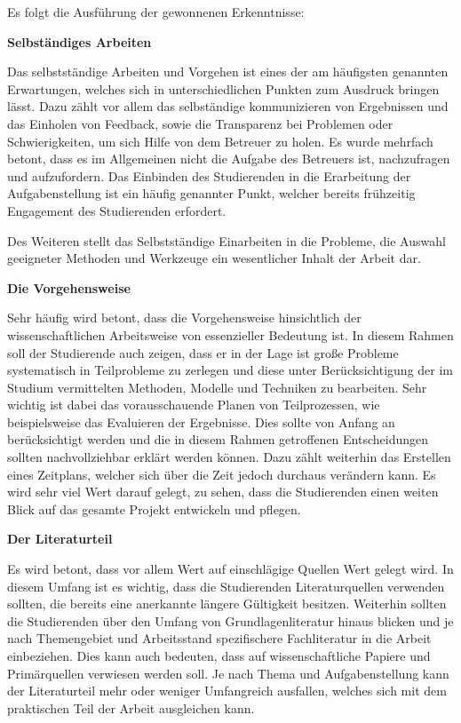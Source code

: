 \documentclass[bibliography=totoc,listof=totoc,BCOR=5mm,DIV=12,oneside]{scrbook}
\begin{document}
\par\medskip Es folgt die Ausführung der gewonnenen Erkenntnisse:

\par \bigskip \textbf{Selbständiges Arbeiten}
\par Das selbstständige Arbeiten und Vorgehen ist eines der am häufigsten genannten Erwartungen, welches sich in unterschiedlichen Punkten zum Ausdruck bringen lässt. Dazu zählt vor allem das selbständige kommunizieren von Ergebnissen und das Einholen von Feedback, sowie die Transparenz bei Problemen oder Schwierigkeiten, um sich Hilfe von dem Betreuer zu holen. Es wurde mehrfach betont, dass es im Allgemeinen nicht die Aufgabe des Betreuers ist, nachzufragen und aufzufordern. Das Einbinden des Studierenden in die Erarbeitung der Aufgabenstellung ist ein häufig genannter Punkt, welcher bereits frühzeitig Engagement des Studierenden erfordert.
\par Des Weiteren stellt das Selbstständige Einarbeiten in die Probleme, die Auswahl geeigneter Methoden und Werkzeuge ein wesentlicher Inhalt der Arbeit dar.
\par \bigskip \textbf{Die Vorgehensweise}
\par Sehr häufig wird betont, dass die Vorgehensweise hinsichtlich der wissenschaftlichen Arbeitsweise von essenzieller Bedeutung ist. In diesem Rahmen soll der Studierende auch zeigen, dass er in der Lage ist große Probleme systematisch in Teilprobleme zu zerlegen und diese unter Berücksichtigung der im Studium vermittelten Methoden, Modelle und Techniken zu bearbeiten. Sehr wichtig ist dabei das vorausschauende Planen von Teilprozessen, wie beispielsweise das Evaluieren der Ergebnisse. Dies sollte von Anfang an berücksichtigt werden und die in diesem Rahmen getroffenen Entscheidungen sollten nachvollziehbar erklärt werden können. Dazu zählt weiterhin das Erstellen eines Zeitplans, welcher sich über die Zeit jedoch durchaus verändern kann. Es wird sehr viel Wert darauf gelegt, zu sehen, dass die Studierenden einen weiten Blick auf das gesamte Projekt entwickeln und pflegen.
\par \bigskip \textbf{Der Literaturteil}
\par Es wird betont, dass vor allem Wert auf einschlägige Quellen Wert gelegt wird. In diesem Umfang ist es wichtig, dass die Studierenden Literaturquellen verwenden sollten, die bereits eine anerkannte längere Gültigkeit besitzen. Weiterhin sollten die Studierenden über den Umfang von Grundlagenliteratur hinaus blicken und je nach Themengebiet und Arbeitsstand spezifischere Fachliteratur in die Arbeit einbeziehen. Dies kann auch bedeuten, dass auf wissenschaftliche Papiere und Primärquellen verwiesen werden soll. Je nach Thema und Aufgabenstellung kann der Literaturteil mehr oder weniger Umfangreich ausfallen, welches sich mit dem praktischen Teil der Arbeit ausgleichen kann.
\end{document}
